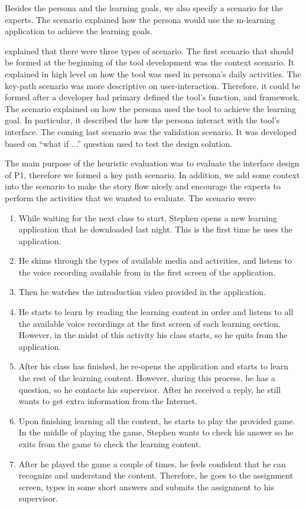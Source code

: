 Besides the persona and the learning goals, we also specify a scenario for the experts. The scenario explained how the persona would use the m-learning application to achieve the learning goals. 

\cite{cooper2007face} explained that there were three types of scenario. The first scenario that should be formed at the beginning of the tool development was the context scenario. It explained in high level on how the tool was used in persona's daily activities. The key-path scenario was more descriptive on user-interaction. Therefore, it could be formed after a developer had primary defined the tool's function, and framework. The scenario explained on how the persona used the tool to achieve the learning goal. In particular, it described the how the persona interact with the tool's interface. The coming last scenario was the validation scenario. It was developed based on ``what if ...'' question used to test the design solution. 

The main purpose of the heuristic evaluation was to evaluate the interface design of P1, therefore we formed a key path scenario. In addition, we add some context into the scenario to make the story flow nicely and encourage the experts to perform the activities that we wanted to evaluate. The scenario were: 

\begin{enumerate}
\item While waiting for the next class to start, Stephen opens a new learning application that he downloaded last night. This is the first time he uses the application.
\item He skims through the types of available media and activities, and listens to the voice recording available from in the first screen of the application.
\item Then he watches the introduction video provided in the application. 
\item He starts to learn by reading the learning content in order and listens to all the available voice recordings at the first screen of each learning section. However, in the midst of this activity his class starts, so he quits from the application. 
\item After his class has finished, he re-opens the application and starts to learn the rest of the learning content. However, during this process, he has a question, so he contacts his supervisor. After he received a reply, he still wants to get extra information from the Internet.
\item Upon finishing learning all the content, he starts to play the provided game. In the middle of playing the game, Stephen wants to check his answer so he exits from the game to check the learning content. 
\item After he played the game a couple of times, he feels confident that he can recognize and understand the content. Therefore, he goes to the assignment screen, types in some short answers and submits the assignment to his supervisor. 
\end{enumerate} 

